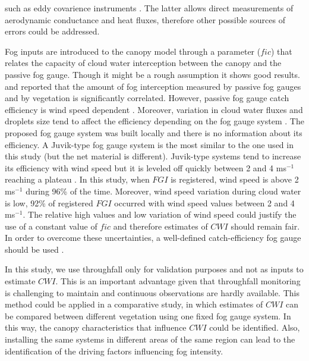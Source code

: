 \documentclass[a4paper,12pt]{article}
\begin{document}
such as eddy covarience instruments \citep{Holwerdaetal2012}. The latter allows direct measurements of aerodynamic conductance and heat fluxes, therefore other possible sources of errors could be addressed.

Fog inputs are introduced to the canopy model through a parameter ($fic$) that relates the capacity of cloud water interception between the canopy and the passive fog gauge. Though it might be a rough assumption it shows good results. \cite{Villegasetal2008} and \cite{Holwerdaetal2011} reported that the amount of fog interception measured by passive fog gauges and by vegetation is significantly correlated. However, passive fog gauge catch efficiency is wind speed dependent \citep{Frumauetal2011, Holwerdaetal2012}. Moreover, variation in cloud water fluxes and droplets size tend to affect the efficiency depending on the fog gauge system \citep{Frumauetal2011}. The proposed fog gauge system was built locally and there is no information about its efficiency. A Juvik-type fog gauge system \citep{Juvik1978} is the most similar to the one used in this study (but the net material is different). Juvik-type systems tend to increase its efficiency with wind speed but it is leveled off quickly between 2 and 4 ms$^{-1}$ reaching a plateau \citep{Frumauetal2011}. In this study, when $FGI$ is registered, wind speed is above 2 ms$^{-1}$ during 96\% of the time. Moreover, wind speed variation during cloud water is low, 92\% of registered $FGI$ occurred with wind speed values between 2 and 4 ms$^{-1}$. The relative high values and low variation of wind speed could justify the use of a constant value of $fic$ and therefore estimates of $CWI$ should remain fair. In order to overcome these uncertainties, a well-defined catch-efficiency fog gauge should be used \citep{Holwerdaetal2011, Frumauetal2011}.

In this study, we use throughfall only for validation purposes and not as inputs to estimate $CWI$. This is an important advantage given that throughfall monitoring is challenging to maintain and continuous observations are hardly available. This method could be applied in a comparative study, in which estimates of $CWI$ can be compared between different vegetation using one fixed fog gauge system. In this way, the canopy characteristics that influence $CWI$ could be identified. Also, installing the same systems in different areas of the same region can lead to the identification of the driving factors influencing fog intensity. 
\end{document}
